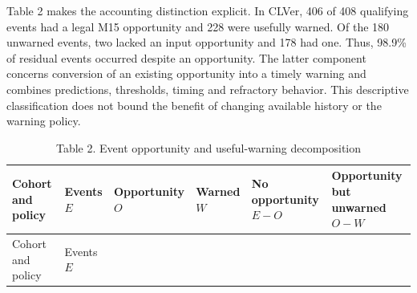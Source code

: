 \documentclass[
  american,
  11pt,
  letterpaper,
]{article}
\begin{document}
Table 2 makes the accounting distinction explicit. In CLVer, 406 of 408
qualifying events had a legal M15 opportunity and 228 were usefully
warned. Of the 180 unwarned events, two lacked an input opportunity and
178 had one. Thus, 98.9\% of residual events occurred despite an
opportunity. The latter component concerns conversion of an existing
opportunity into a timely warning and combines predictions, thresholds,
timing and refractory behavior. This descriptive classification does not
bound the benefit of changing available history or the warning policy.

\Needspace{2.1in}
\begin{longtable}[]{@{}
  >{\raggedright\arraybackslash}p{}
  >{\raggedleft\arraybackslash}p{}
  >{\raggedleft\arraybackslash}p{}
  >{\raggedleft\arraybackslash}p{}
  >{\raggedleft\arraybackslash}p{}
  >{\raggedleft\arraybackslash}p{}@{}}
\caption{Table 2. Event opportunity and useful-warning
decomposition}\tabularnewline
\toprule\noalign{}
\begin{minipage}[b]{\linewidth}\raggedright
Cohort and policy
\end{minipage} & \begin{minipage}[b]{\linewidth}\raggedleft
Events \(E\)
\end{minipage} & \begin{minipage}[b]{\linewidth}\raggedleft
Opportunity \(O\)
\end{minipage} & \begin{minipage}[b]{\linewidth}\raggedleft
Warned \(W\)
\end{minipage} & \begin{minipage}[b]{\linewidth}\raggedleft
No opportunity \(E-O\)
\end{minipage} & \begin{minipage}[b]{\linewidth}\raggedleft
Opportunity but unwarned \(O-W\)
\end{minipage} \\
\midrule\noalign{}
\endfirsthead
\toprule\noalign{}
\begin{minipage}[b]{\linewidth}\raggedright
Cohort and policy
\end{minipage} & \begin{minipage}[b]{\linewidth}\raggedleft
Events \(E\)
\end{minipage} & \begin{minipage}[b]{\linewidth}\raggedleft

\end{minipage}
\end{longtable}
\end{document}

